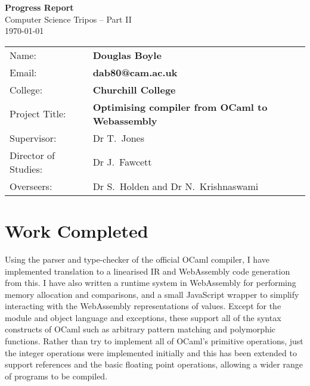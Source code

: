 \documentclass[a4paper,12pt,twoside]{report} %
\def\authorname{Douglas Boyle\xspace}
\def\authorcollege{Churchill College\xspace}
\def\dissertationtitle{Optimising compiler from OCaml to Webassembly}
\begin{document}
%
%
%



\newpage


\pagestyle{empty}

\rightline{\LARGE \textbf{\authorname} }

\vspace*{60mm}
\begin{center}
\Huge
\textbf{Progress Report} \\[5mm]
Computer Science Tripos -- Part II \\[5mm]
\today  %
\end{center}


\newpage
\pagestyle{plain}


{\large
\begin{tabular}{ll}
Name:               & \bf\authorname     \\
Email: 		& \bf{dab80@cam.ac.uk} \\
College:            & \bf\authorcollege     \\
Project Title:      & \bf\dissertationtitle \\
Supervisor:         &  Dr T.~Jones                   \\ 
Director of Studies: & Dr J.~Fawcett \\
Overseers: & Dr S.~Holden and Dr N.~Krishnaswami
\end{tabular}
}


\section*{Work Completed} %
Using the parser and type-checker of the official OCaml compiler, I have implemented translation to a linearised IR and WebAssembly code generation from this. I have also written a runtime system in WebAssembly for performing memory allocation and comparisons, and a small JavaScript wrapper to simplify interacting with the WebAssembly representations of values. Except for the module and object language and exceptions, these support all of the syntax constructs of OCaml such as arbitrary pattern matching and polymorphic functions. Rather than try to implement all of OCaml's primitive operations, just the integer operations were implemented initially and this has been extended to support references and the basic floating point operations, allowing a wider range of programs to be compiled. 
\end{document}
